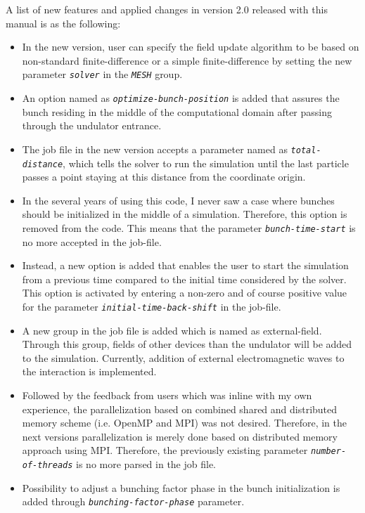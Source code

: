 A list of new features and applied changes in version 2.0 released with this manual is as the following:
%
\begin{itemize}
	\setlength{\parskip}{0pt}
	\setlength{\itemsep}{0pt plus 1pt}
	\item In the new version, user can specify the field update algorithm to be based on non-standard finite-difference or a simple finite-difference by setting the new parameter {\tt \small \em solver} in the {\tt \small \em MESH} group.
	\item An option named as {\tt \small \em optimize-bunch-position} is added that assures the bunch residing in the middle of the computational domain after passing through the undulator entrance.
	\item The job file in the new version accepts a parameter named as {\tt \small \em total-distance}, which tells the solver to run the simulation until the last particle passes a point staying at this distance from the coordinate origin.
	\item In the several years of using this code, I never saw a case where bunches should be initialized in the middle of a simulation. Therefore, this option is removed from the code. This means that the parameter {\tt \small \em bunch-time-start} is no more accepted in the job-file.
	\item Instead, a new option is added that enables the user to start the simulation from a previous time compared to the initial time considered by the solver. This option is activated by entering a non-zero and of course positive value for the parameter {\tt \small \em initial-time-back-shift} in the job-file.
	\item A new group in the job file is added which is named as external-field. Through this group, fields of other devices than the undulator will be added to the simulation. Currently, addition of external electromagnetic waves to the interaction is implemented.
	\item Followed by the feedback from users which was inline with my own experience, the parallelization based on combined shared and distributed memory scheme (i.e. OpenMP and MPI) was not desired. Therefore, in the next versions parallelization is merely done based on distributed memory approach using MPI. Therefore, the previously existing parameter {\tt \em \small number-of-threads} is no more parsed in the job file.
	\item Possibility to adjust a bunching factor phase in the bunch initialization is added through {\tt \small \em bunching-factor-phase} parameter.

\end{itemize}
